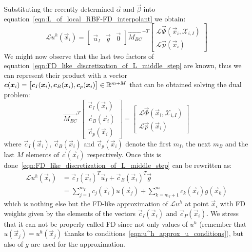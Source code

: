 \medskip
Substituting the recently determined $\vec{\alpha}$ and $\vec{\beta}$ into equation~\eqref{eqn:L_of_local_RBF-FD_interpolant} we obtain:
\begin{equation}
	\label{eqn:FD_like_discretization_of_L_middle_step}
	\mathcal{L} u^h(\vec{x}_i) = 
	\begin{bmatrix}
		\vec{u}_I  &  \vec{g}  &  \vec{0}
	\end{bmatrix}
	\vec{M_{BC}}^{-T}
	\begin{bmatrix}
		\mathcal{L} \vec{\Phi}(\vec{x}_i, \mathcal{X}_{i,I})  \\
		\mathcal{L} \vec{p}(\vec{x}_i)
	\end{bmatrix}	
\end{equation}
We might now observe that the last two factors of equation~\eqref{eqn:FD_like_discretization_of_L_middle_step} are known, thus we can represent their product with a vector $\boldsymbol{c}(\boldsymbol{x}_i) = \bigl[ \boldsymbol{c}_I(\boldsymbol{x}_i), \boldsymbol{c}_B(\boldsymbol{x}_i), \boldsymbol{c}_p(\boldsymbol{x}_i) \bigr] \in \mathbb{R}^{m+M}$ that can be obtained solving the dual problem:
\begin{equation}
\label{eqn:row_of_C_system}
	\vec{M_{BC}}^T
	\begin{bmatrix}
		\vec{c}_I(\vec{x}_i)  \\
		\vec{c}_B(\vec{x}_i)  \\
		\vec{c}_p(\vec{x}_i)
   \end{bmatrix} = 
	\begin{bmatrix}
		\mathcal{L} \vec{\Phi}(\vec{x}_i, \mathcal{X}_{i,I})  \\
		\mathcal{L} \vec{p}(\vec{x}_i)
	\end{bmatrix}
\end{equation}
where $\vec{c}_I(\vec{x}_i)$, $\vec{c}_B(\vec{x}_i)$ and $\vec{c}_p(\vec{x}_i)$ denote the first $m_I$, the next $m_B$ and the last $M$ elements of $\vec{c}(\vec{x}_i)$ respectively.
Once this is done~\eqref{eqn:FD_like_discretization_of_L_middle_step} can be rewritten as:
\begin{equation}
	\begin{aligned}
		\mathcal{L} u^h(\vec{x}_i) & = \vec{c}_I(\vec{x}_i)^T \vec{u}_I + \vec{c}_B(\vec{x}_i)^T \vec{g}  \\
								   & = \sum_{j=1}^{m_I} c_j(\vec{x}_i) u(\vec{x}_j) + \sum_{k=m_I+1}^{m} c_k(\vec{x}_i)g(\vec{x}_k)
	\end{aligned}
\end{equation}
which is nothing else but the FD-like approximation of $\mathcal{L}u^h$ at point $\vec{x}_i$ with FD weights given by the elements of the vectors $\vec{c}_I(\vec{x}_i)$ and $\vec{c}_P(\vec{x}_i)$. We stress that it can not be properly called FD since not only values of $u^h$ (remember that $u(\vec{x}_j) = u^h(\vec{x}_j)$ thanks to conditions~\eqref{eqn:u^h_approx_u_conditions}), but also of $g$ are used for the approximation.

